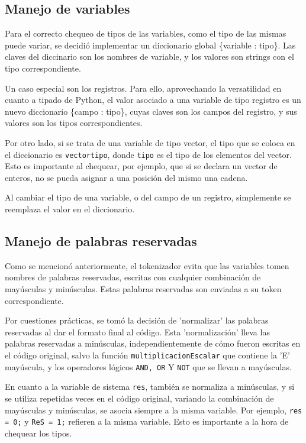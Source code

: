 \subsection{Manejo de variables}

Para el correcto chequeo de tipos de las variables, como el tipo de las mismas puede variar, se decidió implementar un diccionario global \{variable : tipo\}.  Las claves del diccinario son los nombres de variable, y los valores son strings con el tipo correspondiente.

Un caso especial son los registros.  Para ello, aprovechando la versatilidad en cuanto a tipado de Python, el valor asociado a una variable de tipo registro es un nuevo diccionario \{campo : tipo\}, cuyas claves son los campos del registro, y sus valores son los tipos correspondientes.

Por otro lado, si se trata de una variable de tipo vector, el tipo que se coloca en el diccionario es {\tt vectortipo}, donde {\tt tipo} es el tipo de los elementos del vector.  Esto es importante al chequear, por ejemplo, que si se declara un vector de enteros, no se pueda asignar a una posición del mismo una cadena.

Al cambiar el tipo de una variable, o del campo de un registro, simplemente se reemplaza el valor en el diccionario.

\subsection{Manejo de palabras reservadas}

Como se mencionó anteriormente, el tokenizador evita que las variables tomen nombres de palabras reservadas, escritas con cualquier combinación de mayúsculas y minúsculas.  Estas palabras reservadas son enviadas a su token correspondiente.

Por cuestiones prácticas, se tomó la decisión de 'normalizar' las palabras reservadas al dar el formato final al código.  Esta 'normalización' lleva las palabras reservadas a minúsculas, independientemente de cómo fueron escritas en el código original, salvo la función {\tt multiplicacionEscalar} que contiene la 'E' mayúscula, y los operadores lógicos {\tt AND, OR} Y {\tt NOT} que se llevan a mayúsculas.

En cuanto a la variable de sistema {\tt res}, también se normaliza a minúsculas, y si se utiliza repetidas veces en el código original, variando la combinación de mayúsculas y minúsculas, se asocia siempre a la misma variable.  Por ejemplo, {\tt res = 0;} y {\tt ReS = 1;} refieren a la misma variable.  Esto es importante a la hora de chequear los tipos.